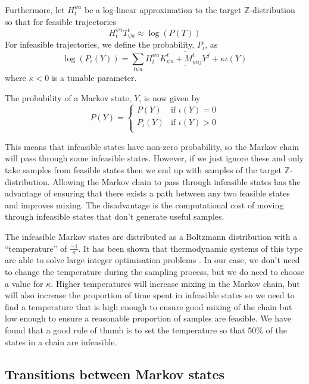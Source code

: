 \documentclass{article}
\begin{document}
Furthermore, let $H_t^{\psi a}$ be a log-linear approximation to the target $\mathbb{Z}$-distribution so that for feasible trajectories
\[
H_t^{\psi a}T^t_{\psi a} \approx \log(P(T))
\]
For infeasible trajectories, we define the probability, $P_\iota$, as
\begin{equation}
\log(P_\iota(Y)) = \sum_{t \psi a} H_t^{\psi a}\overline{\underline{K^t_{\psi a}+M^{t}_{\psi aj}Y^j}} + \kappa\iota(Y)
\label{loglinprob}
\end{equation}
where $\kappa < 0$ is a tunable parameter.

The probability of a Markov state, $Y$, is now given by
\begin{equation}
P(Y) =
\begin{cases}
P(Y) & \text{if } \iota(Y) = 0\\
P_\iota(Y) & \text{if } \iota(Y) > 0\\
\end{cases}
\end{equation}

This means that infeasible states have non-zero probability, so the Markov chain will pass through some infeasible states.  However, if we just ignore these and only take samples from feasible states then we end up with samples of the target $\mathbb{Z}$-distribution. Allowing the Markov chain to pass through infeasible states has the advantage of ensuring that there exists a path between any two feasible states and improves mixing. The disadvantage is the computational cost of moving through infeasible states that don't generate useful samples.

The infeasible Markov states are distributed as a Boltzmann distribution with a ``temperature'' of $\frac{-1}{\kappa}$.  It has been shown that thermodynamic systems of this type are able to solve large integer optimisation problems \cite{kirkpatrick1983optimization}. In our case, we don't need to change the temperature during the sampling process, but we do need to choose a value for $\kappa$. Higher temperatures will increase mixing in the Markov chain, but will also increase the proportion of time spent in infeasible states so we need to find a temperature that is high enough to ensure good mixing of the chain but low enough to ensure a reasonable proportion of samples are feasible. We have found that a good rule of thumb is to set the temperature so that 50\% of the states in a chain are infeasible.

\subsection{Transitions between Markov states}
\end{document}
